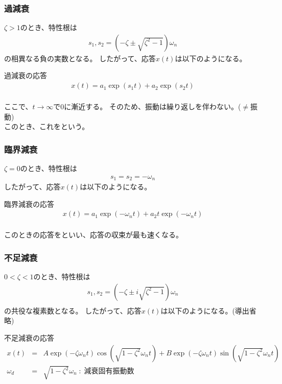 \documentclass[a4paper]{jsarticle}
\begin{document}
\subsubsection{過減衰}
$\zeta>1$のとき、特性根は
\begin{eqnarray*}
    s_1,s_2=\left(-\zeta \pm \sqrt{\zeta^2-1}\right)\omega_n
\end{eqnarray*}
の相異なる負の実数となる。
したがって、応答$x\left(t\right)$は以下のようになる。
\begin{itembox}[l]{過減衰の応答}
    \begin{eqnarray*}
        x\left(t\right)=a_1\exp{\left(s_1t\right)}+a_2\exp{\left(s_2t\right)}\\
    \end{eqnarray*}
\end{itembox}
ここで、$t\rightarrow\infty$で$0$に漸近する。
そのため、振動は繰り返しを伴わない。($\neq$振動)\\
このとき、これをという。
\subsubsection{臨界減衰}
$\zeta = 0$のとき、特性根は
\begin{eqnarray*}
    s_1=s_2=-\omega_n
\end{eqnarray*}
したがって、応答$x\left(t\right)$は以下のようになる。
\begin{itembox}[l]{臨界減衰の応答}
    \begin{eqnarray*}
        x\left(t\right)=a_1\exp{\left(-\omega_nt\right)}+a_2t\exp{\left(-\omega_nt\right)}\\
    \end{eqnarray*}
\end{itembox}
このときの応答をといい、応答の収束が最も速くなる。
\subsubsection{不足減衰}
$0<\zeta<1$のとき、特性根は
\begin{eqnarray*}
    s_1,s_2=\left(-\zeta \pm i\sqrt{\zeta^2-1}\right)\omega_n\\
\end{eqnarray*}
の共役な複素数となる。
したがって、応答$x\left(t\right)$は以下のようになる。(導出省略)
\begin{itembox}[l]{不足減衰の応答}
    \begin{eqnarray*}
        x\left(t\right)&=&A\exp{\left(-\zeta \omega_nt\right)}\cos{\left(\sqrt{1-\zeta^2}\omega_nt\right)}+B\exp{\left(-\zeta \omega_nt\right)}\sin{\left(\sqrt{1-\zeta^2}\omega_nt\right)}\\
        \omega_d&=&\sqrt{1-\zeta^2}\omega_n\;:\;減衰固有振動数\\
    \end{eqnarray*}
\end{itembox}
\end{document}
